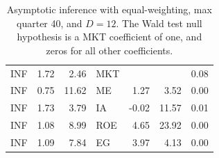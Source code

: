 \documentclass[12pt]{article}
\begin{document}
\begin{table}[ht]
\begin{tabular}{lrrlrrr}
		\hline
		INF & 1.72 & 2.46 & MKT &  &  & 0.08 \\ 
		INF & 0.75 & 11.62 & ME & 1.27 & 3.52 & 0.00 \\ 
		INF & 1.73 & 3.79 & IA & -0.02 & 11.57 & 0.01 \\ 
		INF & 1.08 & 8.99 & ROE & 4.65 & 23.92 & 0.00 \\ 
		INF & 1.09 & 7.84 & EG & 3.97 & 4.13 & 0.00 \\ 
		\hline
	\end{tabular}
	\caption{Asymptotic inference with equal-weighting, max quarter 40, and $D=12$. The Wald test null hypothesis is a MKT coefficient of one, and zeros for all other coefficients.} 
		\label{tab:ai_40_ew_dep} 
\end{table}


\end{document}
